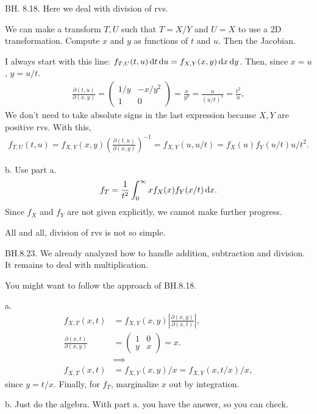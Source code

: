 \begin{exercise}
BH. 8.18. Here we deal with division of rvs.
\begin{hint} We can make a transform $T, U$ such that $T=X/Y$ and $U=X$  to use a 2D transformation. Compute $x$ and $y$ as functions of $t$ and $u$. Then the Jacobian.
\end{hint}
\begin{solution}
I always start with this line: $f_{T,U}(t,u) \,\textrm{d}t \,\textrm{d}u = f_{X,Y}(x,y) \,\textrm{d}x \,\textrm{d}y$.
Then, since $x=u$, $y=u/t$.
\begin{align*}
\frac{\partial (t, u)}{\partial (x,y)} =
  \begin{pmatrix}
1/y & -x/y^{2} \\
    1 & 0
  \end{pmatrix} = \frac{x}{y^{2}} = \frac{u}{(u/t)^{2}} = \frac{t^{2}}{u},
\end{align*}
We don't need to take absolute signs in the last expression because $X, Y$ are positive rvs.
With this,
\begin{align*}
  f_{T,U}(t,u) = f_{X,Y}(x,y) \left(\frac{\partial (t, u)}{\partial (x,y)}\right)^{-1} = f_{X,Y}(u,u/t) = f_X(u)f_Y(u/t) u/t^{2}.
\end{align*}

b. Use part a.
\begin{align*}
f_{T} = \frac 1{t^2} \int_0^{\infty} x f_X(x) f_Y(x/t) \,\textrm{d}x.
\end{align*}
Since $f_X$ and $f_Y$ are not given explicitly, we cannot make further progress.

All and all, division of rvs is not so simple.
\end{solution}
\end{exercise}

\begin{exercise}
BH.8.23. We already analyzed how to handle addition, subtraction and division. It remains to deal with multiplication.
\begin{hint}
You might want to follow the approach of BH.8.18.
\end{hint}
\begin{solution}
a.
\begin{align*}
f_{X,T}(x,t) &= f_{X,Y}(x,y) |\frac{\partial (x,y)}{\partial (x, t)}|, \\
\frac{\partial (x,t)}{\partial (x,y)} &=
  \begin{pmatrix}
    1 & 0 \\
y & x
  \end{pmatrix} = x. \\
&\implies \\
f_{X,T}(x,t) &= f_{X,Y}(x,y)/x= f_{X,Y}(x,t/x)/x,
\end{align*}
since $y=t/x$. Finally, for $f_T$, marginalize $x$ out by integration.

b. Just do the algebra. With part a. you have the answer, so you can check.
\end{solution}
\end{exercise}

